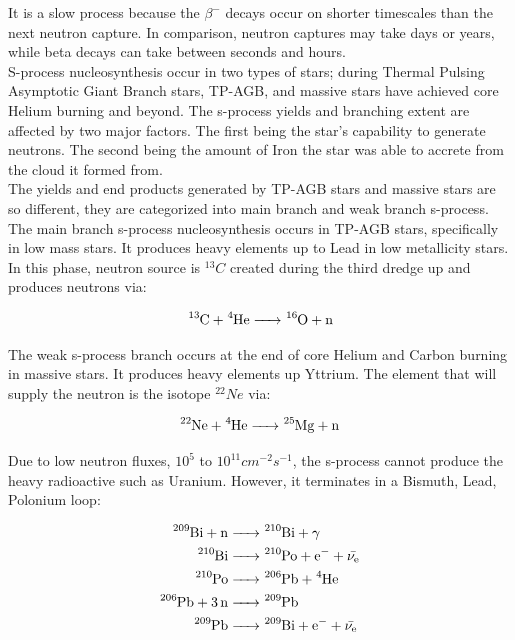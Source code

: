 \documentclass{article}
\begin{document}
 It is a slow process because the $\beta^{-}$ decays occur on shorter timescales than the next neutron capture. In comparison, 
neutron captures may take days or years, while beta decays can take between seconds and hours.\\

 S-process nucleosynthesis occur in two types of stars; during Thermal Pulsing Asymptotic Giant Branch stars, TP-AGB, and massive stars 
have achieved core Helium burning and beyond. The s-process yields and branching extent are affected by two major factors. The first being the 
star's capability to generate neutrons. The second being the amount of Iron the star was able to accrete from the cloud it formed from.\\

 The yields and end products generated by TP-AGB stars and massive stars are so different, they are categorized into main branch and weak 
branch s-process. The main branch s-process nucleosynthesis occurs in TP-AGB stars, specifically in low mass stars. It produces heavy 
elements up to Lead in low metallicity stars. In this phase, neutron source is $^{13}C$ created during the third dredge up \cite{kww} and 
produces neutrons via:

\begin{equation*}
\ce{^13C + ^4He -> ^16O + n} 
\end{equation*}

 The weak s-process branch occurs at the end of core Helium and Carbon burning in massive stars. It produces heavy elements up Yttrium.
The element that will supply the neutron is the isotope $^{22}Ne$ via:

\begin{equation*}
    \ce{^22Ne + ^4He -> ^25Mg + n}
\end{equation*}

 Due to low neutron fluxes, $10^{5}$ to $10^{11} cm^{-2}s^{-1}$, the s-process cannot produce the heavy radioactive such as Uranium. 
However, it terminates in a Bismuth, Lead, Polonium loop:

\begin{align*}
    \ce{^209Bi + n &-> ^210Bi + \gamma}\\
    \ce{^210Bi &-> ^210Po + e^- + \bar{\nu_{e}}}\\
    \ce{^210Po &-> ^206Pb + ^4He}\\
    \ce{^206Pb + 3n &-> ^209Pb}\\
    \ce{^209Pb &-> ^209Bi + e^- + \bar{\nu_{e}}}
\end{align*}
\end{document}
